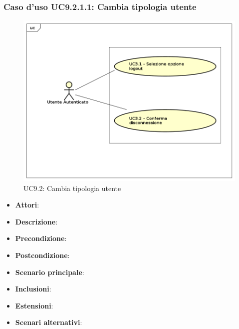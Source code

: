 			\subsubsection{Caso d'uso UC9.2.1.1: Cambia tipologia utente}
			\label{UC9.2.1.1}
			\begin{figure}[h]
				\centering
			\includegraphics[scale=0.7,keepaspectratio]{UML/UC9.png}
				\caption{UC9.2: Cambia tipologia utente}
			\end{figure}
			\FloatBarrier
			\begin{itemize}
				\item \textbf{Attori}: 
				\item \textbf{Descrizione}: 
				\item \textbf{Precondizione}: 
				\item \textbf{Postcondizione}: 
				\item \textbf{Scenario principale}:
				\item \textbf{Inclusioni}:
				\item \textbf{Estensioni}:
				\item \textbf{Scenari alternativi}:
			\end{itemize}
			
